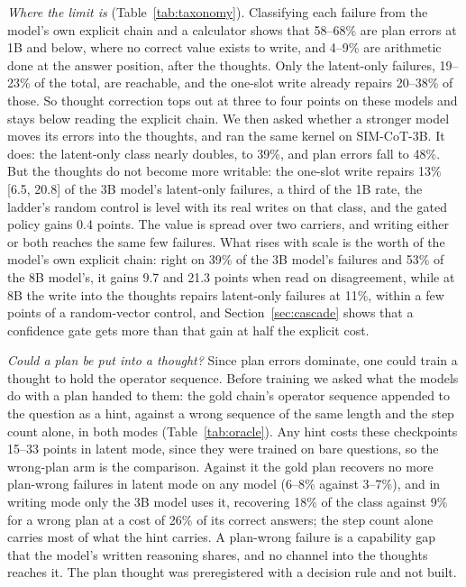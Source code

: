 \documentclass{article}
\begin{document}
\emph{Where the limit is} (Table~\ref{tab:taxonomy}). Classifying each failure from the model's own explicit chain and a calculator shows that 58--68\% are plan errors at 1B and below, where no correct value exists to write, and 4--9\% are arithmetic done at the answer position, after the thoughts. Only the latent-only failures, 19--23\% of the total, are reachable, and the one-slot write already repairs 20--38\% of those. So thought correction tops out at three to four points on these models and stays below reading the explicit chain. We then asked whether a stronger model moves its errors into the thoughts, and ran the same kernel on SIM-CoT-3B. It does: the latent-only class nearly doubles, to 39\%, and plan errors fall to 48\%. But the thoughts do not become more writable: the one-slot write repairs 13\% [6.5, 20.8] of the 3B model's latent-only failures, a third of the 1B rate, the ladder's random control is level with its real writes on that class, and the gated policy gains 0.4 points. The value is spread over two carriers, and writing either or both reaches the same few failures. What rises with scale is the worth of the model's own explicit chain: right on 39\% of the 3B model's failures and 53\% of the 8B model's, it gains 9.7 and 21.3 points when read on disagreement, while at 8B the write into the thoughts repairs latent-only failures at 11\%, within a few points of a random-vector control, and Section~\ref{sec:cascade} shows that a confidence gate gets more than that gain at half the explicit cost.

\emph{Could a plan be put into a thought?} Since plan errors dominate, one could train a thought to hold the operator sequence. Before training we asked what the models do with a plan handed to them: the gold chain's operator sequence appended to the question as a hint, against a wrong sequence of the same length and the step count alone, in both modes (Table~\ref{tab:oracle}). Any hint costs these checkpoints 15--33 points in latent mode, since they were trained on bare questions, so the wrong-plan arm is the comparison. Against it the gold plan recovers no more plan-wrong failures in latent mode on any model (6--8\% against 3--7\%), and in writing mode only the 3B model uses it, recovering 18\% of the class against 9\% for a wrong plan at a cost of 26\% of its correct answers; the step count alone carries most of what the hint carries. A plan-wrong failure is a capability gap that the model's written reasoning shares, and no channel into the thoughts reaches it. The plan thought was preregistered with a decision rule and not built.
\end{document}
